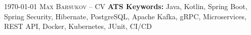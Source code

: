 
\makecvfooterwithkeywords
   {\textsc{\monthyeardate\today}}
   {\textsc{Max Barsukov -- CV}}
   {\thepage}
   {\textbf{ATS Keywords:} Java, Kotlin, Spring Boot, Spring Security, Hibernate, PostgreSQL, Apache Kafka, gRPC, Microservices, REST API, Docker, Kubernetes, JUnit, CI/CD}
